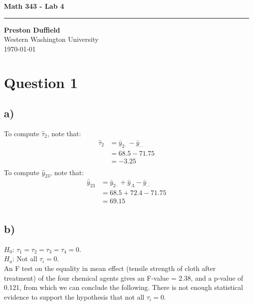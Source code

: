 \documentclass{article}
\begin{document}
\noindent
\begin{minipage}[t]{0.6\textwidth}
    \begin{flushleft}
        \LARGE\textbf{Math 343 - Lab 4} \\
        \vspace{6pt} %
        \hrule width 10cm
        \vspace{12pt}
        \large\textbf{Preston Duffield} \\
        \large Western Washington University \\
        \today
        \vspace{24pt}
    \end{flushleft}
\end{minipage}

\section*{Question 1}
\subsection*{a)}
To compute $\hat{\tau}_2$, note that:
\begin{align*}
    \hat{\tau}_2 &= \bar{y}_{2 \cdot} - \bar{y}_{\cdot \cdot} \\
                 &= 68.5 - 71.75 \\
                 &= -3.25 \\
\end{align*}
To compute $\hat{y}_{2 3}$, note that:
\begin{align*}
    \hat{y}_{2 3} &= \bar{y}_{2 \cdot} + \bar{y}_{\cdot 3} - \bar{y}_{\cdot \cdot} \\
                 &= 68.5 + 72.4 - 71.75 \\
                 &= 69.15 \\
\end{align*}
\subsection*{b)}
$H_0$: $\tau_1 = \tau_2 = \tau_3 = \tau_4 = 0$.\\
$H_a$: Not all $\tau_i = 0$.\\
An F test on the equality in mean effect (tensile strength of cloth after treatment) of the four
chemical agents gives an F-value = 2.38, and a p-value of 0.121, from which we can conclude the following.
There is not enough statistical evidence to support the hypothesis that not all $\tau_i = 0$.
\end{document}
